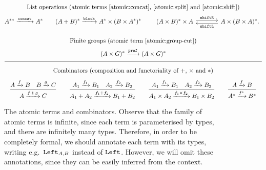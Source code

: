 \begin{figure}
\begin{gather*}
\text{List operations (atomic terms  \ref{atomic:concat}, \ref{atomic:split} and \ref{atomic:shift})} \\[2pt]
 \describeterm{\concatterm} {A^{**}}{A^*} 
\qquad
\describeterm{\blockterm} {(A+B)^*}{A^* \times (B \times A^*)^*}  
\qquad 
    \begin{tikzcd}[ampersand replacement=\&, column sep=large]
(A \times B)^* \times A
\ar[r,"\shiftrterm", shift left=0.6ex]
\&
\ar[l,"\shiftlterm", shift left=0.6ex]
A \times (B \times A)^*.
    \end{tikzcd}
\\[10pt]
\text{Finite groups (atomic term \ref{atomic:group-cut})} \\[2pt]
    (A \times G)^* \xrightarrow{\prefterm} (A \times G)^*
\\[6pt] \hline \\[-6pt]
\text{Combinators (composition and functoriality of $+$, $\times$ and $*$)} \\[4pt]
\combinator{A \xrightarrow f B \quad B \xrightarrow g C}{A \xrightarrow {f \, \comp \, g} C}{}
\qquad
\combinator{A_1 \xrightarrow {f_1} B_1 \quad A_2 \xrightarrow {f_2} B_2}{A_1 + A_2 \xrightarrow {f_1 + f_2} B_1 + B_2}{}
\qquad
\combinator{A_1 \xrightarrow {f_1} B_1 \quad A_2 \xrightarrow {f_2} B_2}{A_1 \times A_2 \xrightarrow {f_1 \times f_2} B_1 \times B_2}{}
\qquad
\combinator{A \xrightarrow f B}{A^* \xrightarrow {f^*} B^*}{}
\end{gather*}
\caption{\label{fig:atomic-rational-terms} The atomic terms and combinators. Observe that the family of atomic terms is infinite, since each term is parameterised by types, and there are infinitely many types. Therefore, in order to be completely formal, we should annotate each term with its types, writing e.g.~$\mathtt{Left}_{A,B}$ instead of $\mathtt{Left}$. However, we will omit these annotations, since they can be easily inferred from the context.}
\end{figure}




